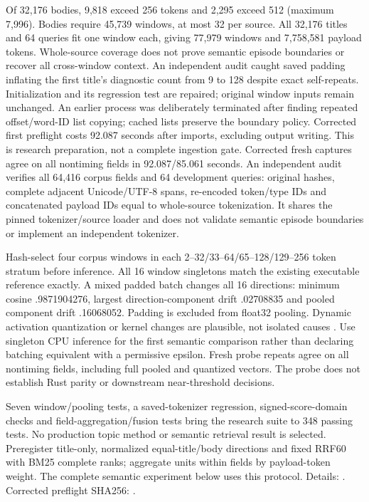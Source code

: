 \documentclass[11pt]{article}
\begin{document}
Of 32,176 bodies, 9,818 exceed 256 tokens and 2,295 exceed 512 (maximum 7,996).
Bodies require 45,739 windows, at most 32 per source. All 32,176 titles and 64
queries fit one window each, giving 77,979 windows and 7,758,581 payload tokens.
Whole-source coverage does not prove semantic episode boundaries or recover
all cross-window context. An independent audit caught saved padding inflating
the first title's diagnostic count from 9 to 128 despite exact self-repeats.
Initialization and its regression test are repaired; original window inputs
remain unchanged. An earlier process was deliberately terminated after finding
repeated offset/word-ID list copying; cached lists preserve the boundary policy.
Corrected first preflight costs 92.087 seconds after imports, excluding output
writing. This is research preparation, not a complete ingestion gate.
Corrected fresh captures agree on all nontiming fields in 92.087/85.061 seconds.
An independent audit verifies all 64,416 corpus fields and 64 development
queries: original hashes, complete adjacent Unicode/UTF-8 spans, re-encoded
token/type IDs and concatenated payload IDs equal to whole-source tokenization.
It shares the pinned tokenizer/source loader and does not validate semantic
episode boundaries or implement an independent tokenizer.

Hash-select four corpus windows in each 2--32/33--64/65--128/129--256 token
stratum before inference. All 16 window singletons match the existing executable
reference exactly. A mixed padded batch changes all 16 directions: minimum
cosine .9871904276, largest direction-component drift .02708835 and pooled
component drift .16068052. Padding is excluded from float32 pooling. Dynamic
activation quantization or kernel changes are plausible, not isolated causes
\cite{ortquantization}. Use singleton CPU inference for the first semantic
comparison rather than declaring batching equivalent with a permissive epsilon.
Fresh probe repeats agree on all nontiming fields, including full pooled and
quantized vectors.
The probe does not establish Rust parity or downstream near-threshold decisions.

Seven window/pooling tests, a saved-tokenizer regression, signed-score-domain
checks and field-aggregation/fusion tests bring the research suite to 348 passing
tests. No production topic method or semantic retrieval result is selected.
Preregister title-only, normalized equal-title/body directions and fixed RRF60
with BM25 complete ranks\cite{rrf2009}; aggregate units within fields by payload-token weight.
The complete semantic experiment below uses this protocol.
Details: .
Corrected preflight SHA256:
.
\end{document}
